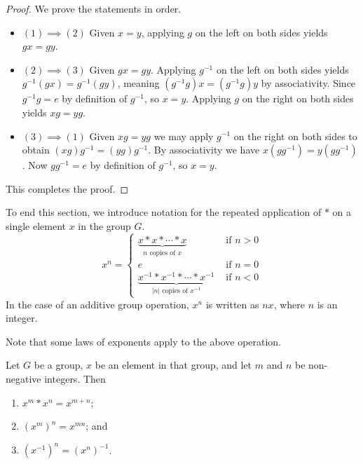 \begin{proof}
    We prove the statements in order.
    \begin{itemize}
        \item $\boxed{(1) \implies (2)}$ Given $x = y$, applying $g$ on the left on both sides yields $gx = gy$.
        
        \item $\boxed{(2) \implies (3)}$ Given $gx = gy$. Applying 
        $g^{-1}$ on the left on both sides yields $g^{-1}(gx) = g^{-1}(gy)$, meaning $(g^{-1}g)x = (g^{-1}g)y$ by associativity. Since $g^{-1}g = e$ by definition of $g^{-1}$, so $x = y$. Applying $g$ on the right on both sides yields $xg = yg$.
        
        \item $\boxed{(3) \implies (1)}$ Given $xg = yg$ we may apply $g^{-1}$ on the right on both sides to obtain $(xg)g^{-1} = (yg)g^{-1}$. By associativity we have $x(gg^{-1}) = y(gg^{-1})$. Now $gg^{-1} = e$ by definition of $g^{-1}$, so $x = y$.
    \end{itemize}
    This completes the proof.
\end{proof}

To end this section, we introduce notation for the repeated application of $\ast$ on a single element $x$ in the group $G$.
\[
    x^n =
    \begin{cases}
        \underbrace{x\ast x\ast \cdots \ast x}_{n \text{ copies of } x} & \text{ if } n > 0\\
        e & \text{ if } n=0 \\
        \underbrace{x^{-1}\ast x^{-1}\ast \cdots \ast x^{-1}}_{|n| \text{ copies of } x^{-1}} & \text{ if } n<0
    \end{cases}
\]
In the case of an additive group operation, $x^n$ is written as $nx$, where $n$ is an integer.

Note that some laws of exponents apply to the above operation.
\begin{proposition}
    Let $G$ be a group, $x$ be an element in that group, and let $m$ and $n$ be non-negative integers. Then
    \begin{enumerate}
        \item $x^m \ast x^n = x^{m+n}$;
        \item $\left(x^m\right)^n = x^{mn}$; and
        \item $\left(x^{-1}\right)^n = \left(x^n\right)^{-1}$.
    \end{enumerate}
\end{proposition}

